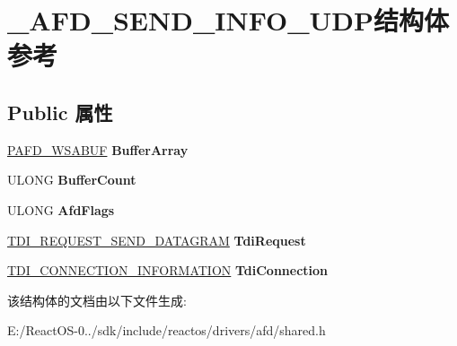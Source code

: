 \hypertarget{struct___a_f_d___s_e_n_d___i_n_f_o___u_d_p}{}\section{\+\_\+\+A\+F\+D\+\_\+\+S\+E\+N\+D\+\_\+\+I\+N\+F\+O\+\_\+\+U\+D\+P结构体 参考}
\label{struct___a_f_d___s_e_n_d___i_n_f_o___u_d_p}
\subsection*{Public 属性}
\begin{DoxyCompactItemize}
\item 
\mbox{\label{struct___a_f_d___s_e_n_d___i_n_f_o___u_d_p_abe17c710724a9346cafd406bcb06fa45}} 
\hyperlink{struct___a_f_d___w_s_a_b_u_f}{P\+A\+F\+D\+\_\+\+W\+S\+A\+B\+UF} {\bfseries Buffer\+Array}
\item 
\mbox{\label{struct___a_f_d___s_e_n_d___i_n_f_o___u_d_p_a0047f113969b2365bc703c073f29b059}} 
U\+L\+O\+NG {\bfseries Buffer\+Count}
\item 
\mbox{\label{struct___a_f_d___s_e_n_d___i_n_f_o___u_d_p_a601ec961689f4af285c0c1d3283b32f2}} 
U\+L\+O\+NG {\bfseries Afd\+Flags}
\item 
\mbox{\label{struct___a_f_d___s_e_n_d___i_n_f_o___u_d_p_abb21fdfc4dec4afa02c503e65006de91}} 
\hyperlink{struct___t_d_i___r_e_q_u_e_s_t___s_e_n_d___d_a_t_a_g_r_a_m}{T\+D\+I\+\_\+\+R\+E\+Q\+U\+E\+S\+T\+\_\+\+S\+E\+N\+D\+\_\+\+D\+A\+T\+A\+G\+R\+AM} {\bfseries Tdi\+Request}
\item 
\mbox{\label{struct___a_f_d___s_e_n_d___i_n_f_o___u_d_p_a4d2deb77644fee8616ed8fceef0a8b03}} 
\hyperlink{struct___t_d_i___c_o_n_n_e_c_t_i_o_n___i_n_f_o_r_m_a_t_i_o_n}{T\+D\+I\+\_\+\+C\+O\+N\+N\+E\+C\+T\+I\+O\+N\+\_\+\+I\+N\+F\+O\+R\+M\+A\+T\+I\+ON} {\bfseries Tdi\+Connection}
\end{DoxyCompactItemize}


该结构体的文档由以下文件生成\+:\begin{DoxyCompactItemize}
\item 
E\+:/\+React\+O\+S-\/0../sdk/include/reactos/drivers/afd/shared.\+h\end{DoxyCompactItemize}
